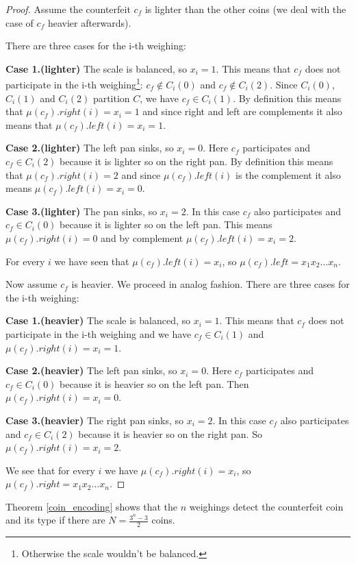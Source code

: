 \begin{proof}
Assume the counterfeit $c_f$ is lighter than the other coins (we deal with the case of $c_f$ heavier afterwards).

There are three cases for the i-th weighing: 

\textbf{Case 1.(lighter)} The scale is balanced, so $x_i=1$. This means that $c_f$ does not participate in the i-th weighing\footnote{Otherwise the scale wouldn't be balanced.}: $c_f \notin C_i(0)$ and $c_f \notin C_i(2)$. Since $C_i(0)$, $C_i(1)$ and $C_i(2)$ partition $C$, we have $c_f \in C_i(1)$. By definition this means that $\mu(c_f).right(i) = x_i = 1$ and since right and left are complements it also means that $\mu(c_f).left(i) = x_i= 1$.

\textbf{Case 2.(lighter)} The left pan sinks, so $x_i=0$. Here $c_f$ participates and $c_f \in C_i(2)$ because it is lighter so on the right pan. By definition this means that $\mu(c_f).right(i) = 2$ and since $\mu(c_f).left(i)$ is the complement it also means $\mu(c_f).left(i) = x_i = 0$.

\textbf{Case 3.(lighter)} The pan sinks, so $x_i=2$. In this case $c_f$ also participates and $c_f \in C_i(0)$ because it is lighter so on the left pan. This means $\mu(c_f).right(i) = 0$ and by complement $\mu(c_f).left(i) = x_i= 2$.
 
For every $i$ we have seen that $\mu(c_f).left(i) = x_i$, so $\mu(c_f).left = x_1 x_2 \ldots x_n$.
 	
Now assume $c_f$ is heavier. We proceed in analog fashion. There are three cases for the i-th weighing:

\textbf{Case 1.(heavier)} The scale is balanced, so $x_i=1$. This means that $c_f$ does not participate in the i-th weighing and we have $c_f \in C_i(1)$ and $\mu(c_f).right(i) = x_i = 1$.

\textbf{Case 2.(heavier)} The left pan sinks, so $x_i=0$. Here $c_f$ participates and $c_f \in C_i(0)$ because it is heavier so on the left pan. Then $\mu(c_f).right(i) = x_i = 0$.

\textbf{Case 3.(heavier)} The right pan sinks, so $x_i=2$. In this case $c_f$ also participates and $c_f \in C_i(2)$ because it is heavier so on the right pan. So $\mu(c_f).right(i) = x_i= 2$.

We see that for every $i$ we have $\mu(c_f).right(i) = x_i$, so $\mu(c_f).right = x_1 x_2 \ldots x_n$.
\end{proof}

Theorem \ref{coin_encoding} shows that the $n$ weighings detect the counterfeit coin and its type if there are $N = \frac{3^n - 3}{2}$ coins.

